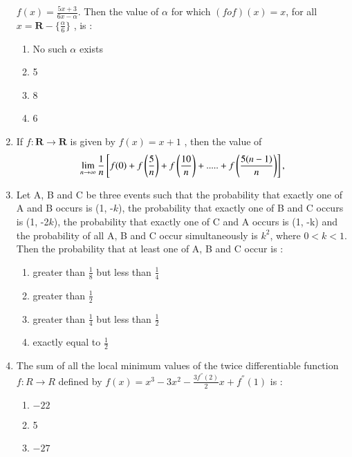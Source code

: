 \documentclass[journal]{IEEEtran}
\begin{document}
\begin{enumerate}
 $f(x) = \frac{5x + 3}{6x - \alpha}.$ Then the value of $\alpha$
 for which $(fof)(x) = x$, for all $x = \textbf{R} - \{ \frac{\alpha}{6} \}$
, is :
\begin{enumerate}
    \item No such $\alpha$ exists
    \item 5 
    \item 8
    \item 6
\end{enumerate}
    \item If $f : \textbf{R} \to \textbf{R}$ is given by $f(x) = x + 1$
, then the value of  \[\lim_{n\to\infty} \frac{1}{n} {}\left[f(0) + f\left(\frac{5}{n}\right) + f \left(\frac{10}{n}\right) + ..... + f\left(\frac{5(n - 1)}{n}\right)\right],\]
\begin{enumerate}
\end{enumerate}
    \item Let A, B and C be three events such that the probability that exactly one of A and B occurs is (1, 
 -$k$), the probability that exactly one of B and C occurs is (1, -2$k$), the probability that exactly one of C and A occurs is (1, -k) and the probability of all A, B and C occur simultaneously is $k^2$, where $0 < k < 1$. Then the probability that at least one of A, B and C occur is :
 \begin{enumerate}
     \item greater than $\frac{1}{8}$ but less than $\frac{1}{4}$
     \item greater than $\frac{1}{2}$
     \item greater than $\frac{1}{4}$ but less than $\frac{1}{2}$
     \item exactly equal to $\frac{1}{2}$
 \end{enumerate}
    \item The sum of all the local minimum values of the twice differentiable function $f : R \to
 R$ defined by  $f(x) = x^3 - 3x^2 - \frac{3f^{''}(2)}{2}x + f^{''}(1)$ is :
 \begin{enumerate}
     \item $-22$
     \item 5
     \item $-27$

\end{enumerate}
\end{enumerate}
\end{document}
